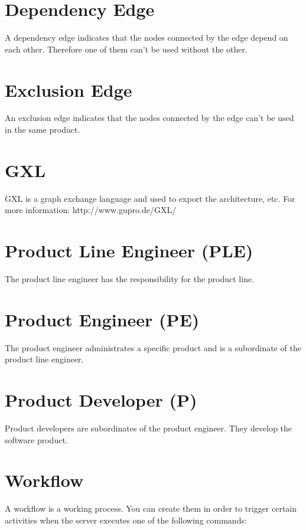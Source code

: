 \section{Dependency Edge}

A dependency edge indicates that the nodes connected by the edge depend on each other.
Therefore one of them can't be used without the other.

\section{Exclusion Edge}

An exclusion edge indicates that the nodes connected by the edge can't be used
in the same product.

\section{GXL}

GXL is a graph exchange language and used to export the architecture, etc. For more
information: http://www.gupro.de/GXL/

\section{Product Line Engineer (PLE)}

The product line engineer has the responsibility for the product line.

\section{Product Engineer (PE)}

The product engineer administrates a specific product and is a subordinate of the
product line engineer.

\section{Product Developer (P)}

Product developers are subordinates of the product engineer. They develop the software 
product.

\section{Workflow}

A workflow is a working process. You can create them in order to trigger certain
activities when the server executes one of the following commands:


